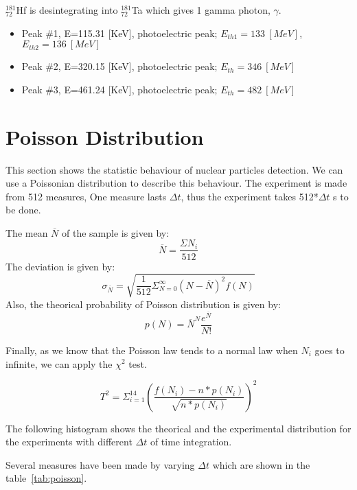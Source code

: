 \documentclass[a4paper,12pt,oneside]{article}
\begin{document}
$_{72}^{181}$Hf is desintegrating into $_{72}^{181}$Ta which gives 1 gamma photon, $\gamma$.

\begin{itemize}
\item Peak \#1, E=115.31 [KeV], photoelectric peak; $E_{th1}=133\ [MeV]$, $E_{th2}=136\ [MeV]$
\item Peak \#2, E=320.15 [KeV], photoelectric peak; $E_{th}=346\ [MeV]$
\item Peak \#3, E=461.24 [KeV], photoelectric peak; $E_{th}=482\ [MeV]$
\end{itemize}

\newpage
\section{Poisson Distribution}

This section shows the statistic behaviour of nuclear particles detection. We can use a Poissonian distribution to describe this behaviour.
The experiment is made from 512 measures, One measure lasts $\Delta t$, thus the experiment takes 512*$\Delta t$ s to be done.

The mean $\overline{N}$ of the sample is given by: $$\overline{N}=\frac{\Sigma N_i}{512}$$
The deviation is given by: $$\sigma_{\overline{N}}=\sqrt{\frac{1}{512}\Sigma^{\infty}_{N=0} (N-\overline{N})^2 f(N)}$$
Also, the theorical probability of Poisson distribution is given by: $$p(N)=\overline{N}^N \frac{e^{\overline{N}}}{N!}$$

Finally, as we know that the Poisson law tends to a normal law when $N_i$ goes to infinite, we can apply the $\chi^2$ test.

$$T^2=\Sigma^{14}_{i=1}{\left(\frac{f(N_i)-n*p(N_i)}{\sqrt{n*p(N_i)}}\right)^2}$$

The following histogram shows the theorical and the experimental distribution for the experiments with different $\Delta t$ of time integration.

Several measures have been made by varying $\Delta t$ which are shown in the table~\ref{tab:poisson}.
\end{document}

